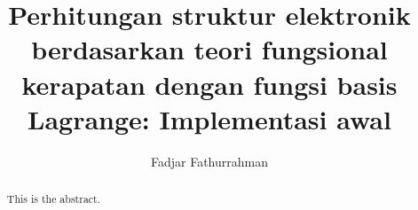 \documentclass[%
reprint,
amsmath,
amssymb,
aps,
bahasa,
]{revtex4-1}
\begin{document}
\title{Perhitungan struktur elektronik berdasarkan teori fungsional
    kerapatan dengan fungsi basis Lagrange: Implementasi awal}
\author{Fadjar Fathurrahman}

\begin{abstract}
This is the abstract.
\end{abstract}

\maketitle








\end{document}

